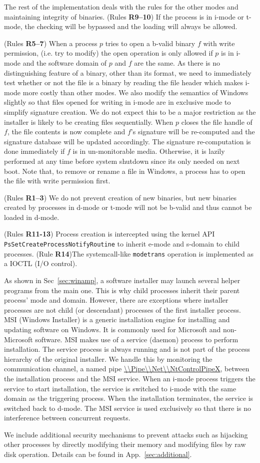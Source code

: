 The rest of the implementation deals with the rules for the other modes
and maintaining integrity of binaries.
(Rules {\bf R9--10})
If the process is in i-mode or t-mode, the checking
will be bypassed and the loading will always be allowed.

(Rules {\bf R5--7})
When a process $p$ tries to open a b-valid binary
$f$ with write permission, (i.e. try to modify)
the open operation is only allowed if $p$ is in i-mode
and the software domain of $p$ and $f$ are the same.
As there is no distinguishing feature of a binary, other than its format,
we need to immediately test whether or not the file is a binary
by reading the file header which  makes i-mode more costly
than other modes.
We also modify the semantics of Windows slightly so that files opened
for writing in i-mode are in exclusive mode to simplify signature creation.
We do not expect this to be a major restriction as the installer is likely
to be creating files sequentially.
When $p$ closes the file handle of $f$, the file contents is now complete
and $f$'s signature will be re-computed and the signature database will 
be updated accordingly.
The signature re-computation is done immediately if $f$ is in 
un-monitorable media.
Otherwise, it is lazily performed at any time before system shutdown since
its only needed on next boot.
Note that, to remove or rename a file in Windows, a process has to open the file
with write permission first.

(Rules {\bf R1--3})
We do not prevent creation of new binaries,
but new binaries created by processes in d-mode or t-mode will not
be b-valid and thus cannot be loaded in d-mode.

(Rules {\bf R11-13}) Process creation is intercepted using
the kernel API {\tt PsSetCreateProcessNotifyRoutine} to inherit e-mode and
s-domain to child processes.
(Rule {\bf R14})The systemcall-like {\tt modetrans} operation
is implemented as a IOCTL (I/O control).

As shown in Sec~\ref{sec:winamp}, a software installer may launch
several helper programs from the main one.
This is why child processes inherit their parent process' mode
and domain.
However, there are exceptions where installer processes
are not child (or descendant) processes of the first installer process.
MSI (Windows Installer) is a generic installation engine
for installing and updating software on Windows.
It is commonly used for Microsoft and non-Microsoft software.
MSI makes use of a service (daemon) process to perform installation.
The service process is always running and is not part of the
process hierarchy of the original installer.
We handle this by monitoring the communication channel, 
a named pipe \url{\\Pipe\\Net\\NtControlPipeX}, between the
installation process and the MSI service.
When an i-mode process triggers the service to start installation,
the service is switched to i-mode with the same domain as the triggering
process.
When the installation terminates, the service is switched back to d-mode.
The MSI service is used exclusively so that there is no interference between
concurrent requests.

We include additional security mechanisms to prevent attacks such as
hijacking other processes by directly modifying their memory and
modifying files by raw disk operation.
Details can be found in App.~\ref{sec:additional}.
